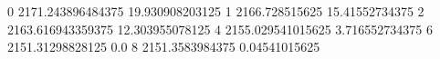 0 2171.243896484375 19.930908203125
1 2166.728515625 15.41552734375
2 2163.616943359375 12.303955078125
4 2155.029541015625 3.716552734375
6 2151.31298828125 0.0
8 2151.3583984375 0.04541015625
